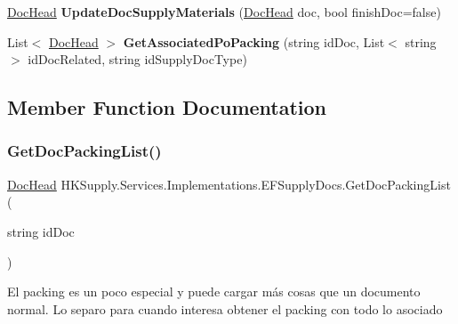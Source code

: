 \begin{DoxyCompactItemize}
\mbox{\hyperlink{class_h_k_supply_1_1_models_1_1_supply_1_1_doc_head}{Doc\+Head}} {\bfseries Update\+Doc\+Supply\+Materials} (\mbox{\hyperlink{class_h_k_supply_1_1_models_1_1_supply_1_1_doc_head}{Doc\+Head}} doc, bool finish\+Doc=false)
\item 
\mbox{\label{class_h_k_supply_1_1_services_1_1_implementations_1_1_e_f_supply_docs_a5bb94831f3617b4b1523fe4c4628e360}} 
List$<$ \mbox{\hyperlink{class_h_k_supply_1_1_models_1_1_supply_1_1_doc_head}{Doc\+Head}} $>$ {\bfseries Get\+Associated\+Po\+Packing} (string id\+Doc, List$<$ string $>$ id\+Doc\+Related, string id\+Supply\+Doc\+Type)
\end{DoxyCompactItemize}


\subsection{Member Function Documentation}
\mbox{\label{class_h_k_supply_1_1_services_1_1_implementations_1_1_e_f_supply_docs_acc782dbf38c03242efdcbfd2e49f31e5}} 
\subsubsection{\texorpdfstring{Get\+Doc\+Packing\+List()}{GetDocPackingList()}}
{\footnotesize\ttfamily \mbox{\hyperlink{class_h_k_supply_1_1_models_1_1_supply_1_1_doc_head}{Doc\+Head}} H\+K\+Supply.\+Services.\+Implementations.\+E\+F\+Supply\+Docs.\+Get\+Doc\+Packing\+List (\begin{DoxyParamCaption}\item[{string}]{id\+Doc }\end{DoxyParamCaption})}



El packing es un poco especial y puede cargar más cosas que un documento normal. Lo separo para cuando interesa obtener el packing con todo lo asociado 


